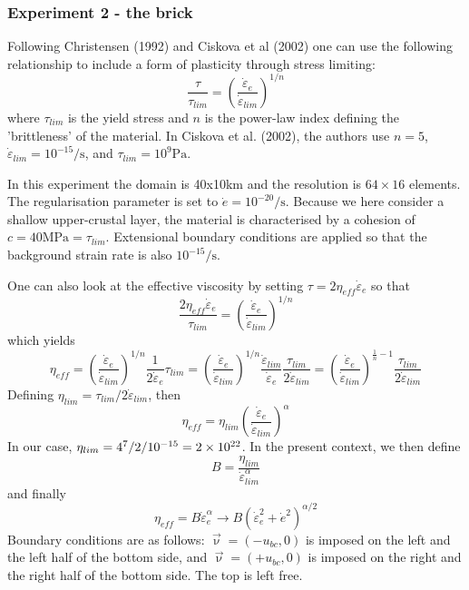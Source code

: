 \newpage
\subsubsection*{Experiment 2 - the brick }

Following Christensen (1992) \cite{chri92} and Ciskova et al (2002) \cite{civv02} 
one can use the following relationship to include a form of plasticity through stress limiting:
\[
\frac{\tau}{\tau_{lim}} = \left( \frac{ \dot{\varepsilon}_e  }{ \dot{\varepsilon}_{lim}  }  \right)^{1/n}
\]
where $\tau_{lim}$ is the yield stress and $n$ is the power-law index defining the 'brittleness'
of the material. In Ciskova et al. (2002), 
the authors use $n=5$, $\dot{\varepsilon}_{lim}=10^{-15}\si{\per\second}$, 
and $\tau_{lim}=10^{9}\si{\pascal}$. 

In this experiment the domain is 40x10\si{\kilo\metre} and the resolution is $64\times 16$ elements. 
The regularisation parameter is set to $\dot{e}=10^{-20}\si{\per\second}$.
Because we here consider a shallow upper-crustal 
layer, the material is characterised by a cohesion of $c=40\si{\mega\pascal}=\tau_{lim}$.
Extensional boundary conditions are applied so that the background strain rate is 
also $10^{-15}\si{\per\second}$.

One can also look at the effective viscosity by 
setting $\tau = 2 \eta_{eff} \dot{\varepsilon}_e$ so that
\[
\frac{2 \eta_{eff}\dot{\varepsilon}_e }{\tau_{lim}} = 
\left( \frac{ \dot{\varepsilon}_e  }{ \dot{\varepsilon}_{lim}  }  \right)^{1/n}
\]
which yields
\[
\eta_{eff} = \left( \frac{ \dot{\varepsilon}_e  }{ \dot{\varepsilon}_{lim} } \right)^{1/n}   
\frac{1}{ 2\dot{\varepsilon}_e} \tau_{lim}
=
\left( \frac{ \dot{\varepsilon}_e  }{ \dot{\varepsilon}_{lim}  }  \right)^{1/n} 
\frac{\dot{\varepsilon}_{lim} }{\dot{\varepsilon}_e} \frac{\tau_{lim}   }{2 \dot{\varepsilon}_{lim}} 
=
\left( \frac{ \dot{\varepsilon}_e  }{ \dot{\varepsilon}_{lim}  }  \right)^{\frac{1}{n}-1}  
\frac{\tau_{lim}   }{2 \dot{\varepsilon}_{lim}} 
\]
Defining $\eta_{lim}=\tau_{lim} /  2 \dot{\varepsilon}_{lim}$, then
\[
\eta_{eff} = \eta_{lim} \left( \frac{ \dot{\varepsilon}_e  }{ \dot{\varepsilon}_{lim}  }  
\right)^{\alpha}
\]
In our case, $\eta_{lim}= 4\time 10^7/2/10^{-15}=2\times10^{22}$. 
In the present context, we then define
\[
B
= \frac{ \eta_{lim} }{\dot{\varepsilon}_{lim}^{\alpha}}
\]
and finally 
\[
\eta_{eff} = B \dot{\varepsilon}_e^\alpha \rightarrow B (\dot{\varepsilon}_e^2 + \dot{e}^2 )^{\alpha/2}
\]
Boundary conditions are as follows: $\vec{\upnu}=(-u_{bc},0)$ is imposed on the left and the left half 
of the bottom side, and $\vec{\upnu}=(+u_{bc},0)$ is imposed on the right and the right half
of the bottom side. The top is left free.  

